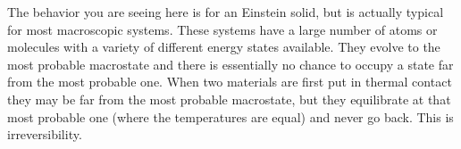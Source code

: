 The behavior you are seeing here is for an Einstein solid, but is actually typical for
most macroscopic systems. These systems have a large number of atoms or molecules
with a variety of different energy states available.
They evolve to the most probable macrostate and there is essentially no chance to occupy a state
far from the most probable one. 
When two materials are first put in thermal contact they may be far from the most probable 
macrostate, but they equilibrate at that most probable one (where the temperatures are equal)
and never go back.
This is irreversibility.












